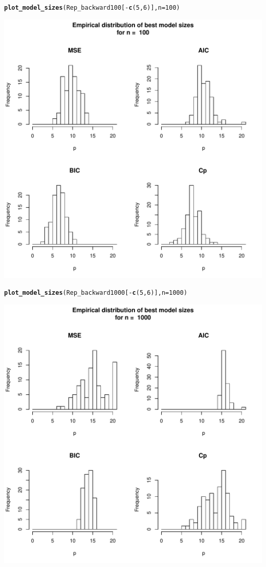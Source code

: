 \documentclass[11pt]{article}\usepackage[]{graphicx}\usepackage[]{color}
\makeatletter
\def\maxwidth{ %
  \ifdim\Gin@nat@width>\linewidth
    \linewidth
  \else
    \Gin@nat@width
  \fi
}
\newcommand{\hlnum}[1]{\textcolor[rgb]{0.686,0.059,0.569}{#1}}%
\newcommand{\hlopt}[1]{\textcolor[rgb]{0,0,0}{#1}}%
\newcommand{\hlstd}[1]{\textcolor[rgb]{0.345,0.345,0.345}{#1}}%
\newcommand{\hlkwc}[1]{\textcolor[rgb]{0.333,0.667,0.333}{#1}}%
\newcommand{\hlkwd}[1]{\textcolor[rgb]{0.737,0.353,0.396}{\textbf{#1}}}%
\newenvironment{kframe}{%
 \def\at@end@of@kframe{}%
 \ifinner\ifhmode%
  \def\at@end@of@kframe{\end{minipage}}%
  \begin{minipage}{\columnwidth}%
 \fi\fi%
 \def\FrameCommand##1{\hskip\@totalleftmargin \hskip-\fboxsep
 \colorbox{shadecolor}{##1}\hskip-\fboxsep
     \hskip-\linewidth \hskip-\@totalleftmargin \hskip\columnwidth}%
 \MakeFramed {\advance\hsize-\width
   \@totalleftmargin\z@ \linewidth\hsize
   \@setminipage}}%
 {\par\unskip\endMakeFramed%
 \at@end@of@kframe}
\newenvironment{knitrout}{}{} %
\makeatother
\begin{document}
\begin{knitrout}
\begin{kframe}
\begin{alltt}
\hlkwd{plot_model_sizes}\hlstd{(Rep_backward100[}\hlopt{-}\hlkwd{c}\hlstd{(}\hlnum{5}\hlstd{,}\hlnum{6}\hlstd{)],}\hlkwc{n}\hlstd{=}\hlnum{100}\hlstd{)}
\end{alltt}
\end{kframe}
\includegraphics[width=\maxwidth]{figure/unnamed-chunk-6-3} 
\begin{kframe}\begin{alltt}
\hlkwd{plot_model_sizes}\hlstd{(Rep_backward1000[}\hlopt{-}\hlkwd{c}\hlstd{(}\hlnum{5}\hlstd{,}\hlnum{6}\hlstd{)],}\hlkwc{n}\hlstd{=}\hlnum{1000}\hlstd{)}
\end{alltt}
\end{kframe}
\includegraphics[width=\maxwidth]{figure/unnamed-chunk-6-4} 

\end{knitrout}
\end{document}

